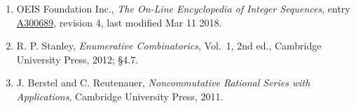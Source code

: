 \documentclass[11pt]{article}
\theoremstyle{definition}
\begin{document}
\begin{enumerate}

\item OEIS Foundation Inc., \emph{The On-Line Encyclopedia of Integer Sequences}, entry \href{https://oeis.org/A300689}{A300689}, revision 4, last modified Mar 11 2018.

\item R. P. Stanley, \emph{Enumerative Combinatorics}, Vol.~1, 2nd ed., Cambridge University Press, 2012; \S4.7.

\item J. Berstel and C. Reutenauer, \emph{Noncommutative Rational Series with Applications}, Cambridge University Press, 2011.

\end{enumerate}
\end{document}

